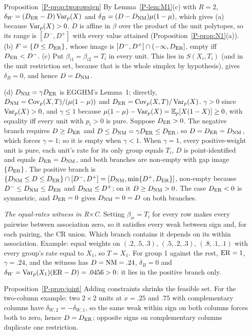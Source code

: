 \begin{proofof}{Proposition~\ref{P-prop:tworowsign}}
By Lemma~\ref{P-lem:M1}(c) with $R=2$, $\delta_W=(D_{\mathrm{ER}}-D)\operatorname{Var}_p(X)$ and
$\delta_B=(D-D_{\mathrm{NM}})\mu(1-\mu)$, which gives (a) because $\operatorname{Var}_p(X)>0$. $D$ is affine in
$\beta$ over the product of the unit polytopes, so its range is $[D^-,D^+]$ with every
value attained (Proposition~\ref{P-prop:N1}(a)). (b) $F=\{D\le D_{\mathrm{ER}}\}$, whose image is
$[D^-,D^+]\cap(-\infty,D_{\mathrm{ER}}]$, empty iff $D_{\mathrm{ER}}<D^-$. (c) Put
$\beta_{i1}=\beta_{i2}=T_i$ in every unit. This lies in $S(X_i,T_i)$ (and in the unit
restriction set, because that is the whole simplex by hypothesis), gives $\delta_B=0$,
and hence $D=D_{\mathrm{NM}}$.

(d) $D_{\mathrm{NM}}=\gamma D_{\mathrm{ER}}$ is EGGHM's Lemma~1; directly,
$D_{\mathrm{NM}}=\operatorname{Cov}_p(X,T)/(\mu(1-\mu))$ and $D_{\mathrm{ER}}=\operatorname{Cov}_p(X,T)/\operatorname{Var}_p(X)$. $\gamma>0$ since
$\operatorname{Var}_p(X)>0$, and $\gamma\le1$ because $\mu(1-\mu)-\operatorname{Var}_p(X)=\mathbb E_p[X(1-X)]\ge0$, with
equality iff every unit with $p_i>0$ is pure. Suppose $D_{\mathrm{ER}}>0$. The negative branch
requires $D\ge D_{\mathrm{ER}}$ and $D\le D_{\mathrm{NM}}=\gamma D_{\mathrm{ER}}\le D_{\mathrm{ER}}$, so
$D=D_{\mathrm{ER}}=D_{\mathrm{NM}}$, which forces $\gamma=1$; so it is empty when $\gamma<1$. When
$\gamma=1$, every positive-weight unit is pure, each unit's rate for its only group
equals $T_i$, $D$ is point-identified and equals $D_{\mathrm{ER}}=D_{\mathrm{NM}}$, and both branches are
non-empty with gap image $\{D_{\mathrm{ER}}\}$. The positive branch is
$\{D_{\mathrm{NM}}\le D\le D_{\mathrm{ER}}\}\cap[D^-,D^+]=[D_{\mathrm{NM}},\min\{D^+,D_{\mathrm{ER}}\}]$, non-empty because
$D^-\le D_{\mathrm{NM}}\le D_{\mathrm{ER}}$ and $D_{\mathrm{NM}}\le D^+$; on it $D\ge D_{\mathrm{NM}}>0$. The case
$D_{\mathrm{ER}}<0$ is symmetric, and $D_{\mathrm{ER}}=0$ gives $D_{\mathrm{NM}}=0=D$ on both branches.
\end{proofof}

\emph{The equal-rates witness in R$\times$C.} Setting $\beta_{ir}=T_i$ for every row
makes every pairwise between association zero, so it satisfies every weak between
sign and, for each pairing, the CR union. Which branch contains it depends on its
within association. Example: equal weights on $(.2,.5,.3)$, $(.5,.2,.3)$, $(.8,.1,.1)$
with every group's rate equal to $X_1$, so $T=X_1$. For group 1 against the rest,
$\mathrm{ER}=1$, $\gamma=.24$, and the witness has $D=\mathrm{NM}=.24$, $\delta_B=0$ and
$\delta_W=\operatorname{Var}_p(X_1)(\mathrm{ER}-D)=.0456>0$: it lies in the positive branch only.

\begin{proofof}{Proposition~\ref{P-prop:joint}}
Adding constraints shrinks the feasible set. For the two-column example: two
$2\times2$ units at $x=.25$ and $.75$ with complementary columns have
$\delta_{W,2}=-\delta_{W,1}$, so the same weak within sign on both columns forces both to
zero, hence $D=D_{\mathrm{ER}}$; opposite signs on complementary columns duplicate one
restriction.
\end{proofof}


